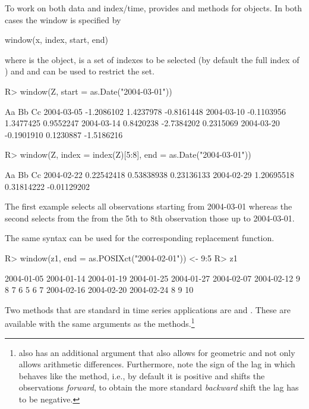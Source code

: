 \documentclass{Z}
\begin{document}
To work on both data and index/time,  provides
 and  methods for  objects.
In both cases the window is specified by
\begin{Scode}
window(x, index, start, end)
\end{Scode}
where  is the  object,  is a set
of indexes to be selected (by default the full index of )
and  and  can be used to restrict the 
 set. 
\begin{Schunk}
\begin{Sinput}
R> window(Z, start = as.Date("2004-03-01"))
\end{Sinput}
\begin{Soutput}
           Aa         Bb         Cc        
2004-03-05 -1.2086102  1.4237978 -0.8161448
2004-03-10 -0.1103956  1.3477425  0.9552247
2004-03-14  0.8420238 -2.7384202  0.2315069
2004-03-20 -0.1901910  0.1230887 -1.5186216
\end{Soutput}
\begin{Sinput}
R> window(Z, index = index(Z)[5:8], end = as.Date("2004-03-01"))
\end{Sinput}
\begin{Soutput}
           Aa          Bb          Cc         
2004-02-22  0.22542418  0.53838938  0.23136133
2004-02-29  1.20695518  0.31814222 -0.01129202
\end{Soutput}
\end{Schunk}

The first example selects all observations starting from 2004-03-01
whereas the second selects from the from the 5th to 8th observation
those up to 2004-03-01.

The same syntax can be used for the corresponding replacement function.
\begin{Schunk}
\begin{Sinput}
R> window(z1, end = as.POSIXct("2004-02-01")) <- 9:5
R> z1
\end{Sinput}
\begin{Soutput}
2004-01-05 2004-01-14 2004-01-19 2004-01-25 2004-01-27 2004-02-07 2004-02-12 
         9          8          7          6          5          6          7 
2004-02-16 2004-02-20 2004-02-24 
         8          9         10 
\end{Soutput}
\end{Schunk}

Two methods that are standard in time series applications
are  and . These are available with the same
arguments as the  methods.\footnote{ also
has an additional argument that also allows for geometric and
not only allows arithmetic differences. Furthermore, note the sign
of the lag in  which behaves like the  method, i.e.,
by default it is positive and shifts the 
observations \emph{forward}, to obtain the more standard \emph{backward}
shift the lag has to be negative.}
\end{document}
